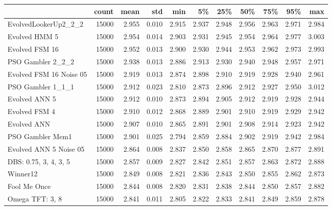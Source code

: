 \begin{tabular}{lrrrrrrrrrr}
\toprule
{} &  count &   mean &    std &    min &     5\% &    25\% &    50\% &    75\% &    95\% &    max \\
\midrule
EvolvedLookerUp2\_2\_2    &  15000 &  2.955 &  0.010 &  2.915 &  2.937 &  2.948 &  2.956 &  2.963 &  2.971 &  2.984 \\
Evolved HMM 5           &  15000 &  2.954 &  0.014 &  2.903 &  2.931 &  2.945 &  2.954 &  2.964 &  2.977 &  3.003 \\
Evolved FSM 16          &  15000 &  2.952 &  0.013 &  2.900 &  2.930 &  2.944 &  2.953 &  2.962 &  2.973 &  2.993 \\
PSO Gambler 2\_2\_2       &  15000 &  2.938 &  0.013 &  2.886 &  2.913 &  2.930 &  2.940 &  2.948 &  2.957 &  2.971 \\
Evolved FSM 16 Noise 05 &  15000 &  2.919 &  0.013 &  2.874 &  2.898 &  2.910 &  2.919 &  2.928 &  2.940 &  2.961 \\
PSO Gambler 1\_1\_1       &  15000 &  2.912 &  0.023 &  2.810 &  2.873 &  2.896 &  2.912 &  2.927 &  2.950 &  3.012 \\
Evolved ANN 5           &  15000 &  2.912 &  0.010 &  2.873 &  2.894 &  2.905 &  2.912 &  2.919 &  2.928 &  2.944 \\
Evolved FSM 4           &  15000 &  2.910 &  0.012 &  2.868 &  2.889 &  2.901 &  2.910 &  2.919 &  2.929 &  2.942 \\
Evolved ANN             &  15000 &  2.907 &  0.010 &  2.865 &  2.891 &  2.901 &  2.908 &  2.914 &  2.923 &  2.942 \\
PSO Gambler Mem1        &  15000 &  2.901 &  0.025 &  2.794 &  2.859 &  2.884 &  2.902 &  2.919 &  2.942 &  2.984 \\
Evolved ANN 5 Noise 05  &  15000 &  2.864 &  0.008 &  2.837 &  2.850 &  2.858 &  2.865 &  2.870 &  2.877 &  2.891 \\
DBS: 0.75, 3, 4, 3, 5   &  15000 &  2.857 &  0.009 &  2.827 &  2.842 &  2.851 &  2.857 &  2.863 &  2.872 &  2.888 \\
Winner12                &  15000 &  2.849 &  0.008 &  2.821 &  2.836 &  2.843 &  2.850 &  2.855 &  2.862 &  2.873 \\
Fool Me Once            &  15000 &  2.844 &  0.008 &  2.820 &  2.831 &  2.838 &  2.844 &  2.850 &  2.857 &  2.882 \\
Omega TFT: 3, 8         &  15000 &  2.841 &  0.011 &  2.805 &  2.822 &  2.833 &  2.841 &  2.849 &  2.859 &  2.878 \\
\bottomrule
\end{tabular}
